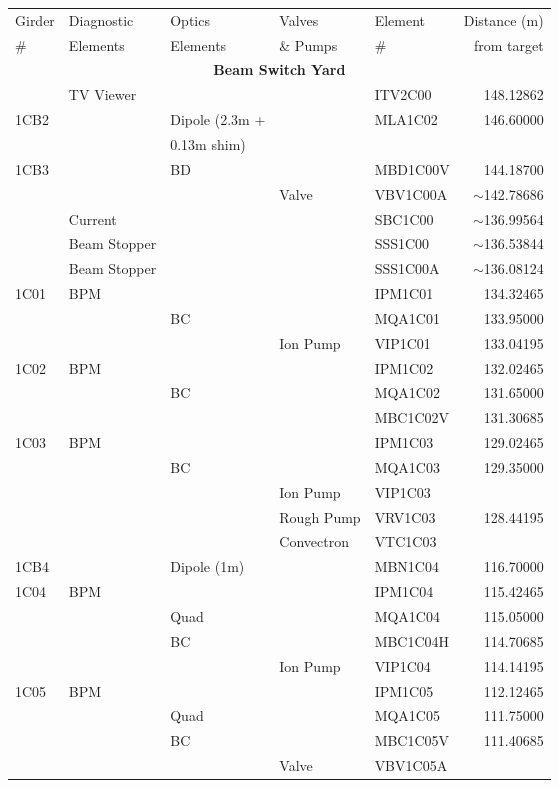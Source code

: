 \vspace*{0.5cm}
\begin{longtable}[hpt]{lllllr}

\hline
Girder & Diagnostic & Optics & Valves & Element & Distance (m) \\
\# & Elements & Elements & \& Pumps & \# & from target \\ \hline
\multicolumn{6}{c}{{\bf Beam Switch Yard}} \\ \hline 
& TV Viewer &&&ITV2C00 & 148.12862 \\ 
1CB2 & & Dipole (2.3m + & & MLA1C02 & 146.60000 \\
&&0.13m shim) &&& \\
1CB3 && BD && MBD1C00V & 144.18700 \\
&&&Valve & VBV1C00A & $\sim$142.78686 \\
& Current &&& SBC1C00 & $\sim$136.99564 \\
& Beam Stopper &&& SSS1C00 & $\sim$136.53844 \\
& Beam Stopper &&& SSS1C00A & $\sim$136.08124 \\
1C01 & BPM &&& IPM1C01 & 134.32465 \\
&& BC && MQA1C01 & 133.95000 \\
&&& Ion Pump & VIP1C01 & 133.04195 \\
1C02 & BPM &&& IPM1C02 & 132.02465 \\
&& BC && MQA1C02 & 131.65000 \\
&&&& MBC1C02V & 131.30685 \\
1C03 & BPM &&& IPM1C03 & 129.02465 \\
&& BC && MQA1C03 & 129.35000 \\
&&& Ion Pump & VIP1C03 & \\
&&& Rough Pump & VRV1C03 & 128.44195 \\
&&& Convectron & VTC1C03 & \\
1CB4 && Dipole (1m) && MBN1C04 & 116.70000 \\
1C04 & BPM &&& IPM1C04 & 115.42465 \\
&& Quad && MQA1C04 & 115.05000 \\
&& BC && MBC1C04H & 114.70685 \\
&&& Ion Pump & VIP1C04 & 114.14195 \\
1C05 & BPM &&& IPM1C05 & 112.12465 \\
&& Quad && MQA1C05 & 111.75000 \\
&& BC && MBC1C05V & 111.40685 \\
&&& Valve & VBV1C05A & \\

\end{longtable}
